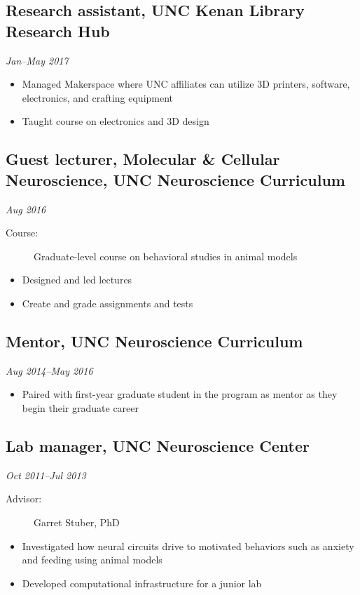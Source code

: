 \documentclass{article}
\newcommand{\dateformat}[1]{\textit{#1}}
\begin{document}
  \subsection*{Research assistant, UNC Kenan Library Research Hub}
    \dateformat{Jan--May 2017}
    \begin{itemize}
      \item Managed Makerspace where UNC affiliates can utilize 3D printers, software, electronics, and crafting equipment
      \item Taught course on electronics and 3D design
    \end{itemize}

  \subsection*{Guest lecturer, Molecular \& Cellular Neuroscience, UNC Neuroscience Curriculum}
  \dateformat{Aug 2016}
    \begin{description}
      \item[Course:] Graduate-level course on behavioral studies in animal models
    \end{description}
    \begin{itemize}
      \item Designed and led lectures
      \item Create and grade assignments and tests
    \end{itemize}

  \subsection*{Mentor, UNC Neuroscience Curriculum}
  \dateformat{Aug 2014--May 2016}
    \begin{itemize}
      \item Paired with first-year graduate student in the program as mentor as they begin their graduate career
    \end{itemize}
    
  \subsection*{Lab manager, UNC Neuroscience Center}
  \dateformat{Oct 2011--Jul 2013}
    \begin{description}
      \item[Advisor:] Garret Stuber, PhD
    \end{description}
    \begin{itemize}
      \item Investigated how neural circuits drive to motivated behaviors such as anxiety and feeding using animal models
      \item Developed computational infrastructure for a junior lab
    \end{itemize}
\end{document}
